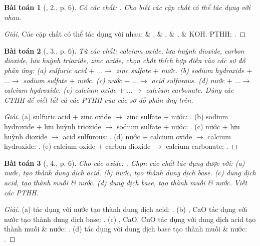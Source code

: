 \documentclass{article}
\newtheorem{baitoan}{Bài toán}
\begin{document}
\begin{baitoan}[\cite{SGK_Hoa_Hoc_9}, 2., p. 6]
	Có các chất: \emph{}. Cho biết các cặp chất có thể tác dụng với nhau.
\end{baitoan}

\begin{proof}[Giải]
	Các cặp chất có thể tác dụng với nhau:  \& ,  \& ,  \& ,  \& KOH. PTHH: .
\end{proof}

\begin{baitoan}[\cite{SGK_Hoa_Hoc_9}, 3., p. 6]
	Từ các chất: calcium oxide, lưu huỳnh dioxide, carbon dioxide, lưu huỳnh trioxide, zinc oxide, chọn chất thích hợp điền vào các sơ đồ phản ứng: (a) sulfuric acid $+$ $\ldots\to$ zinc sulfate $+$ nước. (b) sodium hydroxide $+$ $\ldots\to$ sodium sulfate $+$ nước. (c) nước $+$ $\ldots\to$ acid sulfurous. (d) nước $+$ $\ldots\to$ calcium hydroxide. (e) calcium oxide $+$ $\ldots\to$ calcium carbonate. Dùng các CTHH để viết tất cả các PTHH của các sơ đồ phản ứng trên.
\end{baitoan}

\begin{proof}[Giải]
	(a) sulfuric acid $+$ zinc oxide $\to$ zinc sulfate $+$ nước: . (b) sodium hydroxide $+$ lưu huỳnh trioxide $\to$ sodium sulfate $+$ nước: . (c) nước $+$ lưu huỳnh dioxide $\to$ acid sulfurous: . (d) nước $+$ calcium oxide $\to$ calcium hydroxide: . (e) calcium oxide $+$ carbon dioxide $\to$ calcium carbonate: .
\end{proof}

\begin{baitoan}[\cite{SGK_Hoa_Hoc_9}, 4., p. 6]
	Cho các oxide: \emph{}. Chọn các chất tác dụng được với: (a) nước, tạo thành dung dịch acid. (b) nước, tạo thành dung dịch base. (c) dung dịch acid, tạo thành muối \& nước. (d) dung dịch base, tạo thành muối \& nước. Viết các PTHH.
\end{baitoan}

\begin{proof}[Giải]
	(a)  tác dụng với nước tạo thành dung dịch acid: . (b) , CaO tác dụng với nước tạo thành dung dịch base: . (c) , CaO, CuO tác dụng với dung dịch acid tạo thành muối \& nước: . (d)  tác dụng với dung dịch base tạo thành muối \& nước: .
\end{proof}
\end{document}
